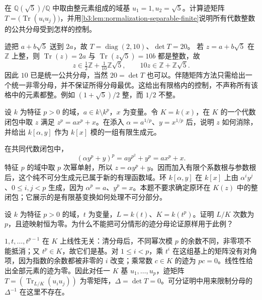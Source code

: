 \begin{exercise}\label{b3:ex:06-trace-bound-quadratic}
	在 \(\mathbb Q(\sqrt5)/\mathbb Q\) 中取由整元素组成的域基 \(u_1=1,u_2=\sqrt5\)。计算迹矩阵 \(T=\bigl(\operatorname{Tr}(u_iu_j)\bigr)\)，并用\cref{b3:lem:normalization-separable-finite}说明所有代数整数的公共分母受到怎样的控制。
\end{exercise}
\begin{solution}
	迹把 \(a+b\sqrt5\) 送到 \(2a\)，故 \(T=\operatorname{diag}(2,10)\)、\(\det T=20\)。 若 \(z=a+b\sqrt5\) 在 \(\mathbb Z\) 上整，则 \(\operatorname{Tr}(z)=2a\) 与 \(\operatorname{Tr}(z\sqrt5)=10b\) 都是整数，故
	\[
		z\in \tfrac12\mathbb Z+\tfrac1{10}\mathbb Z\sqrt5, \qquad 10z\in\mathbb Z+\mathbb Z\sqrt5.
	\]
	因此 \(10\) 已是统一公共分母，当然 \(20=\det T\) 也可以。伴随矩阵方法只需给出一个统一非零分母，并不保证所得分母最优。这给出有限格内的控制，不声称所有该格中的元素都整。例如 \((1+\sqrt5)/2\) 整，而 \(1/2\) 不整。
\end{solution}

\begin{exercise}\label{b3:ex:06-inseparable-finite-coefficients}
	设 \(k\) 为特征 \(p>0\) 的域，\(a\in k\setminus k^p\)，\(x\) 为变量。令 \(K=k(x)\)，在 \(K\) 的一个代数闭包中取 \(z\) 满足 \(z^p=ax^p+x\)。在添入 \(\alpha=a^{1/p}\)、\(y=x^{1/p}\) 后，说明 \(z\) 如何消除，并给出 \(k[\alpha,y]\) 作为 \(k[x]\) 模的一组有限生成元。
\end{exercise}
\begin{solution}
	在共同代数闭包中，
	\[
		(\alpha y^p+y)^p=ay^{p^2}+y^p=ax^p+x.
	\]
	特征 \(p\) 的域中取 \(p\) 次幂单射，所以 \(z=\alpha y^p+y\)。因而加入有限个系数根与参数根后，这个纯不可分生成元已属于新的有理函数域。环 \(k[\alpha,y]\) 在 \(k[x]\) 上由 \(\alpha^i y^j\)、\(0\le i,j<p\) 生成，因为 \(\alpha^p=a\)、\(y^p=x\)。本题不要求确定原环在 \(K(z)\) 中的整闭包；它展示的是有限基变换如何处理不可分部分。
\end{solution}

\begin{exercise}\label{b3:ex:06-inseparable-trace-zero}
	设 \(k\) 为特征 \(p>0\) 的域，\(t\) 为变量，\(L=k(t)\)、\(K=k(t^p)\)。证明 \(L/K\) 次数为 \(p\)，且迹映射恒为零。为什么不能把可分情形的迹分母论证原样用于此例？
\end{exercise}
\begin{solution}
	\(1,t,\ldots,t^{p-1}\) 在 \(K\) 上线性无关：清分母后，不同幂次模 \(p\) 的余数不同，非零项不能抵消；又 \(t^p\in K\)，故它们是基。对 \(1\le i<p\)，乘 \(t^i\) 在这组基上的矩阵没有对角项，因为指数的余数都被非零的 \(i\) 改变；乘常数 \(c\in K\) 的迹为 \(pc=0\)。线性性给出全部元素的迹为零。因此对任一 \(K\) 基 \(u_1,\ldots,u_p\)，迹矩阵 \(T=(\operatorname{Tr}_{L/K}(u_i u_j))\) 为零矩阵，\(\Delta=\det T=0\)。可分证明中用来限制分母的 \(\Delta^{-1}\) 在这里不存在。
\end{solution}

